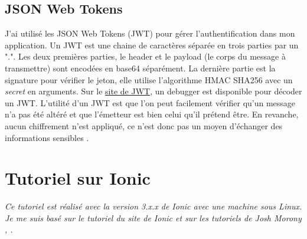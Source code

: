 \documentclass[a4paper, 12pt]{article}
\begin{document}
\subsection{JSON Web Tokens}
J'ai utilisé les JSON Web Tokens (JWT) pour gérer l'authentification dans mon application. Un JWT est une chaine de
caractères séparée en trois parties par un ".". Les deux premières parties, le header et le payload (le corps du
message à transmettre) sont encodées en base64 séparément. La dernière partie est la signature pour vérifier le jeton,
elle utilise l'algorithme HMAC SHA256 avec un \textit{secret} en arguments. Sur le \href{https://jwt.io/}{site de JWT},
un debugger est disponible pour décoder un JWT. L'utilité d'un JWT est que l'on peut facilement vérifier qu'un message
n'a pas été altéré et que l'émetteur est bien celui qu'il prétend être. En revanche, aucun chiffrement n'est appliqué,
ce n'est donc pas un moyen d'échanger des informations sensibles \cite{ref190}.


\section{Tutoriel sur Ionic}
\label{tuto_ionic}
\textit{Ce tutoriel est réalisé avec la version 3.x.x de Ionic avec une machine sous Linux. Je me suis basé sur
le tutoriel du site de Ionic \cite{ref0} et sur les tutoriels de Josh Morony \cite{ref10}, \cite{ref20}.}
\end{document}
